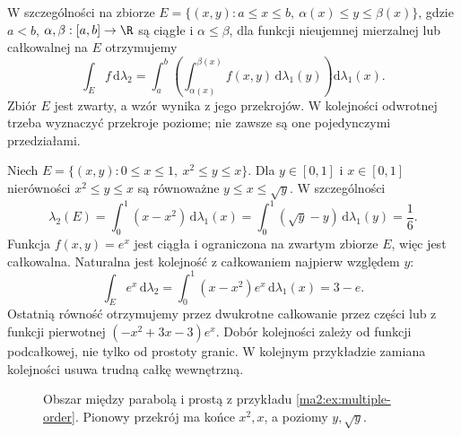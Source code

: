 W szczególności na zbiorze
$E=\{(x,y):a\le x\le b,\ \alpha(x)\le y\le\beta(x)\}$,
gdzie $a<b$, $\alpha,\beta:[a,b]\to\R$ są ciągłe
i $\alpha\le\beta$, dla funkcji nieujemnej
mierzalnej lub całkowalnej na $E$ otrzymujemy
\[
 \int_E f\,\mathrm d\lambda_2
 =\int_a^b\left(\int_{\alpha(x)}^{\beta(x)}
 f(x,y)\,\mathrm d\lambda_1(y)\right)
 \mathrm d\lambda_1(x).
\]
Zbiór $E$ jest zwarty, a wzór wynika z jego
przekrojów. W kolejności odwrotnej trzeba
wyznaczyć przekroje poziome; nie zawsze są one
pojedynczymi przedziałami.

\begin{przyklad}
\label{ma2:ex:multiple-order}
Niech $E=\{(x,y):0\le x\le1,\ x^2\le y\le x\}$.
Dla $y\in[0,1]$ i $x\in[0,1]$ nierówności
$x^2\le y\le x$ są równoważne
$y\le x\le\sqrt y$.
W szczególności
\[
 \lambda_2(E)=\int_0^1(x-x^2)\,\mathrm d\lambda_1(x)
 =\int_0^1(\sqrt y-y)\,\mathrm d\lambda_1(y)=\frac16.
\]
Funkcja $f(x,y)=e^x$ jest ciągła i ograniczona
na zwartym zbiorze $E$, więc jest całkowalna.
Naturalna jest kolejność
z całkowaniem najpierw względem $y$:
\[
 \int_E e^x\,\mathrm d\lambda_2
 =\int_0^1(x-x^2)e^x\,\mathrm d\lambda_1(x)
 =3-e.
\]
Ostatnią równość otrzymujemy przez dwukrotne
całkowanie przez części lub z funkcji pierwotnej
$(-x^2+3x-3)e^x$.
Dobór kolejności zależy od funkcji podcałkowej,
nie tylko od prostoty granic. W kolejnym przykładzie
zamiana kolejności usuwa trudną całkę wewnętrzną.
\end{przyklad}

\begin{figure}[htbp]
\centering
{}
\caption{Obszar między parabolą i prostą z przykładu
\ref{ma2:ex:multiple-order}. Pionowy przekrój ma
końce $x^2,x$, a poziomy $y,\sqrt y$.}
\label{ma2:fig:multiple-order}
\end{figure}

